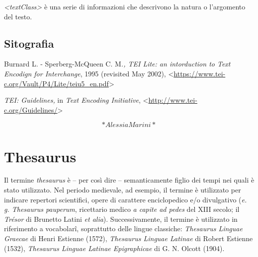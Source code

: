 \documentclass[
  b5paper,
  twoside,
  11pt,
  chapterprefix=false,
  bibliography=totocnumbered,
  parskip=0]{scrbook}
\begin{document}
\emph{\textless textClass\textgreater{}} è una serie di informazioni che descrivono la natura o
l'argomento del testo.

\hypertarget{sitografia-31}{%
\section*{Sitografia}\label{sitografia-31}}

Burnard L. - Sperberg-McQueen C. M\emph{., TEI Lite: an intorduction to Text
Encodign for Interchange}, 1995 (revisited May 2002),
\textless{}\href{https://www.tei-c.org/Vault/P4/Lite/teiu5_en.pdf}{{https://www.tei-c.org/Vault/P4/Lite/teiu5\_en.pdf}}\textgreater{}

\emph{TEI: Guidelines,} in \emph{Text Encoding Initiative},
\textless{}\href{http://www.tei-c.org/Guidelines/}{{http://www.tei-c.org/Guidelines/}}\textgreater{}

\[*Alessia Marini*\]

\hypertarget{thesaurus}{%
\chapter{Thesaurus}\label{thesaurus}}

Il termine \emph{thesaurus} è -- per così dire -- semanticamente figlio dei
tempi nei quali è stato utilizzato. Nel periodo medievale, ad esempio,
il termine è utilizzato per indicare repertori scientifici, opere di
carattere enciclopedico e/o divulgativo (\emph{e. g. Thesaurus pauperum},
ricettario medico \emph{a capite ad pedes} del XIII secolo; il \emph{Trésor} di
Brunetto Latini \emph{et alia}). Successivamente, il termine è utilizzato in
riferimento a vocabolarî, soprattutto delle lingue classiche: \emph{Thesaurus
Linguae Graecae} di Henri Estienne (1572), \emph{Thesaurus Linguae Latinae}
di Robert Estienne (1532), \emph{Thesaurus Linguae Latinae Epigraphicae} di
G. N. Olcott (1904).
\end{document}
